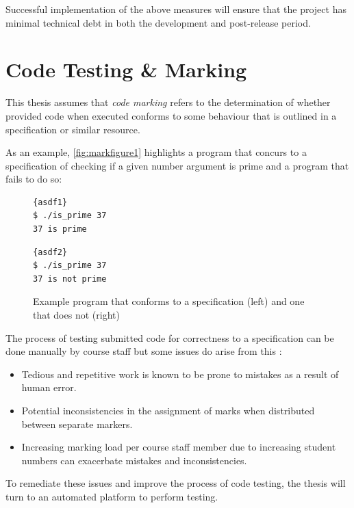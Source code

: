 \documentclass[hidelinks]{report}
\begin{document}
Successful implementation of the above measures will ensure that the project has minimal technical debt in both the development and post-release period.

\section{Code Testing \& Marking}

This thesis assumes that \textit{code marking} refers to the determination of whether provided code when executed conforms to some behaviour that is outlined in a specification or similar resource.

As an example, \autoref{fig:markfigure1} highlights a program that concurs to a specification of checking if a given number argument is prime and a program that fails to do so:

\begin{figure}[h]
	\centering
	\noindent
	\begin{multicols}{2}
		\begin{lstlisting}[linewidth=0.95\linewidth, title=Correct Program, frame=tlrb]{asdf1}
$ ./is_prime 37
37 is prime
		\end{lstlisting}
		\begin{lstlisting}[linewidth=0.95\linewidth, title=Incorrect Program, frame=tlrb]{asdf2}
$ ./is_prime 37
37 is not prime
		\end{lstlisting}
	\end{multicols}
	\caption{Example program that conforms to a specification (left) and one that does not (right)}
	\label{fig:markfigure1}
\end{figure}

The process of testing submitted code for correctness to a specification can be done manually by course staff but some issues do arise from this \cite{ManualProblem}:
\begin{itemize}
	\item Tedious and repetitive work is known to be prone to mistakes as a result of human error.
	\item Potential inconsistencies in the assignment of marks when distributed between separate markers.
	\item Increasing marking load per course staff member due to increasing student numbers can exacerbate mistakes and inconsistencies.
\end{itemize}

To remediate these issues and improve the process of code testing, the thesis will turn to an automated platform to perform testing. 
\clearpage
\end{document}

